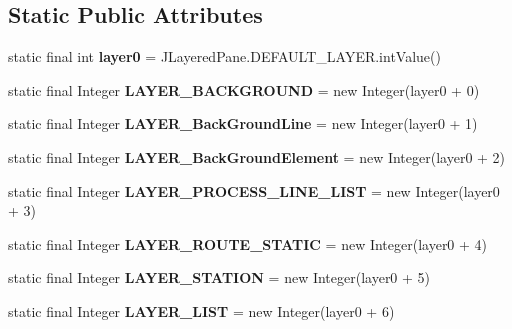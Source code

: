 \subsection*{Static Public Attributes}
\begin{DoxyCompactItemize}
\item 
static final int {\bfseries layer0} = J\-Layered\-Pane.\-D\-E\-F\-A\-U\-L\-T\-\_\-\-L\-A\-Y\-E\-R.\-int\-Value()\label{interfacedesmoj_1_1extensions_1_1visualization2d_1_1engine_1_1model_grafic_1_1_grafic_a2ecfd90281cb0af72baf76eb67cd3bee}

\item 
static final Integer {\bfseries L\-A\-Y\-E\-R\-\_\-\-B\-A\-C\-K\-G\-R\-O\-U\-N\-D} = new Integer(layer0 + 0)\label{interfacedesmoj_1_1extensions_1_1visualization2d_1_1engine_1_1model_grafic_1_1_grafic_a149ea88d5f8feb49e44462a845e7bab7}

\item 
static final Integer {\bfseries L\-A\-Y\-E\-R\-\_\-\-Back\-Ground\-Line} = new Integer(layer0 + 1)\label{interfacedesmoj_1_1extensions_1_1visualization2d_1_1engine_1_1model_grafic_1_1_grafic_a815e6145815d4b3a2611bbc53cde704b}

\item 
static final Integer {\bfseries L\-A\-Y\-E\-R\-\_\-\-Back\-Ground\-Element} = new Integer(layer0 + 2)\label{interfacedesmoj_1_1extensions_1_1visualization2d_1_1engine_1_1model_grafic_1_1_grafic_a53d9169b3e4644f187153977e0c77f05}

\item 
static final Integer {\bfseries L\-A\-Y\-E\-R\-\_\-\-P\-R\-O\-C\-E\-S\-S\-\_\-\-L\-I\-N\-E\-\_\-\-L\-I\-S\-T} = new Integer(layer0 + 3)\label{interfacedesmoj_1_1extensions_1_1visualization2d_1_1engine_1_1model_grafic_1_1_grafic_aba5c9d44b886ffa7c181d6333282d25e}

\item 
static final Integer {\bfseries L\-A\-Y\-E\-R\-\_\-\-R\-O\-U\-T\-E\-\_\-\-S\-T\-A\-T\-I\-C} = new Integer(layer0 + 4)\label{interfacedesmoj_1_1extensions_1_1visualization2d_1_1engine_1_1model_grafic_1_1_grafic_a87def9674caf870e501c9f3d49242ffd}

\item 
static final Integer {\bfseries L\-A\-Y\-E\-R\-\_\-\-S\-T\-A\-T\-I\-O\-N} = new Integer(layer0 + 5)\label{interfacedesmoj_1_1extensions_1_1visualization2d_1_1engine_1_1model_grafic_1_1_grafic_ae3539700735b66c445eea3ffbd281bed}

\item 
static final Integer {\bfseries L\-A\-Y\-E\-R\-\_\-\-L\-I\-S\-T} = new Integer(layer0 + 6)\label{interfacedesmoj_1_1extensions_1_1visualization2d_1_1engine_1_1model_grafic_1_1_grafic_a79dddad928139ce9283405a920fb0365}


\end{DoxyCompactItemize}
